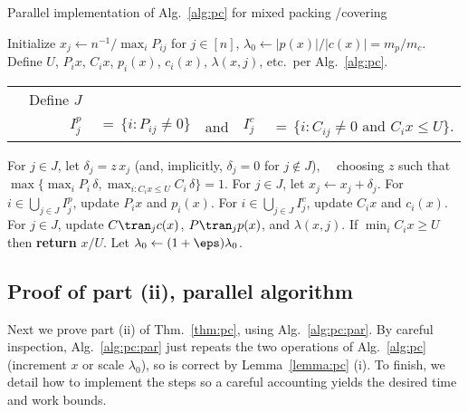 \begin{algorithm}[t]
  \caption{Parallel implementation 
    of Alg.~\ref{alg:pc} 
    for mixed packing /covering \LPs\label{alg:pc:par}}
  \begin{algorithmic}[1]
    \State Initialize $x_{j} \gets n^{-1}/\max_i P_{ij}$ for $j\in [n]$,
    $\lambda_0 \gets |p(x)|/|c(x)| = m_p/m_c$.
    \State Define $U$, $P_i x$, $C_i x$, $p_i(x)$, $c_i(x)$, $\lambda(x,j)$, 
    etc.~per Alg.~\ref{alg:pc}.
    \Repeat
    \label{op:ap}
    \State \begin{tabular}[t]{@{}r@{}r@{\,~}ll@{~~}r@{\,~}l}
      & Define $J$ & 
      \rlap{$\,=\, \{j\in [n] : \lambda(x,j) \le (1+\eps)\lambda_0\}$,
        and, for $j\in J$,}
      \\
&$I^p_j$ & $\,=\, \{i :P_{ij} \ne 0\}$
      &and& $I^c_j$ & $\,=\, \{i : C_{ij} \ne 0 \text{ and } C_i x \le U\}$. \\[3pt]
    \end{tabular}
    \State For $j\in J$, 
    let $\delta_j = z\, x_j$ (and, implicitly, $\delta_j = 0$ for $j\not\in J$),
    \State~~choosing $z$ 
    such that $\max\{ \max_i P_{i}\,\delta, \max_{i: C_i x\le U} C_{i}\,\delta\} = 1$.
    \State For $j\in J$, let $x_j \leftarrow x_j + \delta_j$.
    \State For $i\in \bigcup_{j\in J} I^p_j$, update $P_i x$ and $p_i(x)$.
    For $i\in \bigcup_{j\in J} I^c_j$, update $C_i x$ and $c_i(x)$.
    \State\label{pc:par:update}
    For $j\in J$, update $C\tran_j c(x)$,  $P\tran_j p(x)$, and $\lambda(x,j)$.
    \State If $\min_{i} C_i x \ge U$ then {\bf return} $x/U$. 
    \EndBlock
    \EndWhile 
    \label{op:bp}
    \State Let $\lambda_0 \gets (1+\eps)\lambda_0$.
    \EndBlock
    \EndRepeat
    \EndFunction 
  \end{algorithmic}
\end{algorithm}

\subsection{Proof of part (ii), parallel algorithm}
Next we prove part (ii) of Thm.~\ref{thm:pc}, using Alg.~\ref{alg:pc:par}.
By careful inspection, Alg.~\ref{alg:pc:par}
just repeats the two operations of Alg.~\ref{alg:pc}
(increment $x$ or scale $\lambda_0$),
so is correct by Lemma~\ref{lemma:pc} (i).
To finish, we detail how to implement the steps
so a careful accounting yields the desired time and work bounds.

